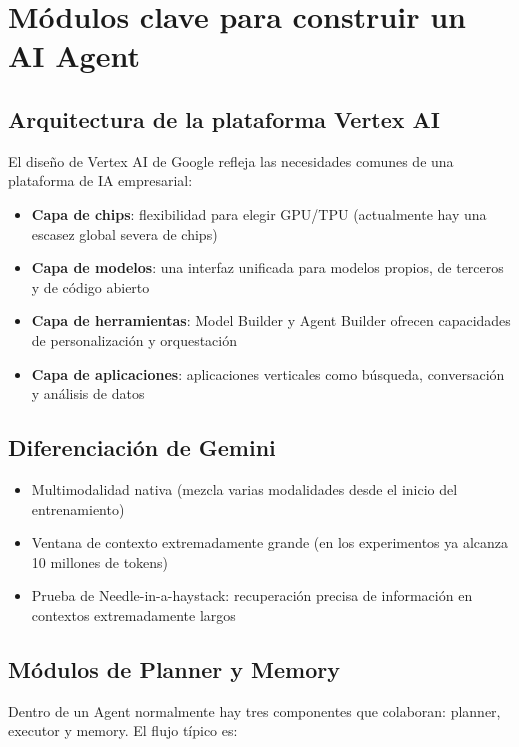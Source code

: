 \section{Módulos clave para construir un AI Agent}

\subsection{Arquitectura de la plataforma Vertex AI}

El diseño de Vertex AI de Google refleja las necesidades comunes de una plataforma de IA empresarial:

\begin{itemize}
    \item \textbf{Capa de chips}: flexibilidad para elegir GPU/TPU (actualmente hay una escasez global severa de chips)
    \item \textbf{Capa de modelos}: una interfaz unificada para modelos propios, de terceros y de código abierto
    \item \textbf{Capa de herramientas}: Model Builder y Agent Builder ofrecen capacidades de personalización y orquestación
    \item \textbf{Capa de aplicaciones}: aplicaciones verticales como búsqueda, conversación y análisis de datos
\end{itemize}

\subsection{Diferenciación de Gemini}

\begin{itemize}
    \item Multimodalidad nativa (mezcla varias modalidades desde el inicio del entrenamiento)
    \item Ventana de contexto extremadamente grande (en los experimentos ya alcanza 10 millones de tokens)
    \item Prueba de Needle-in-a-haystack: recuperación precisa de información en contextos extremadamente largos
\end{itemize}

\subsection{Módulos de Planner y Memory}

Dentro de un Agent normalmente hay tres componentes que colaboran: planner, executor y memory. El flujo típico es:

